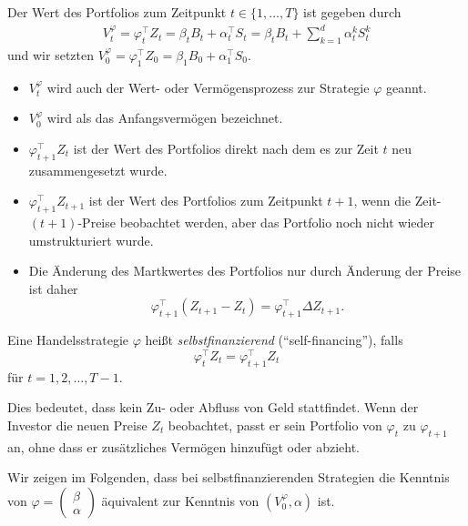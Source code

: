 \documentclass[a4paper,twoside,DIV15,BCOR12mm]{scrbook}
\begin{document}
\begin{definition}
Der Wert des Portfolios zum Zeitpunkt $t\in\{1,\ldots,T\}$ ist gegeben durch 
\begin{align*}
V_t^\varphi  = \varphi_t^\top Z_t = \beta_t B_t + \alpha_t^\top S_t = \beta_tB_t + \sum_{k=1}^d \alpha_t^kS_t^k
\end{align*}
und wir setzten $V_0^\varphi = \varphi_1^\top Z_0 = \beta_1B_0 + \alpha_1^\top S_0$.
\end{definition}

\begin{bemerkung}
\begin{itemize}
\item $V_t^\varphi$ wird auch der Wert- oder Vermögensprozess zur Strategie $\varphi$ geannt.
\item $V_0^\varphi$ wird als das Anfangsvermögen bezeichnet.
\item $\varphi_{t+1}^\top Z_t$ ist der Wert des Portfolios direkt nach dem es zur Zeit $t$ neu zusammengesetzt wurde.
\item $\varphi_{t+1}^\top Z_{t+1}$ ist der Wert des Portfolios zum Zeitpunkt $t+1$, wenn die Zeit-$(t+1)$-Preise beobachtet werden, aber das Portfolio noch nicht wieder umstrukturiert wurde.
\item Die Änderung des Martkwertes des Portfolios nur durch Änderung der Preise ist daher
\[
\varphi_{t+1}^\top (Z_{t+1}-Z_t) = \varphi_{t+1}^\top \Delta Z_{t+1}.
\]
\end{itemize}
\end{bemerkung}

\begin{definition}
Eine Handelsstrategie $\varphi$ heißt \emph{selbstfinanzierend} (“self-financing”), falls
\[
\varphi_t^\top Z_t = \varphi_{t+1}^\top Z_t
\]
für $t=1, 2,\ldots,T-1$.
\end{definition}

Dies bedeutet, dass kein Zu- oder Abfluss von Geld stattfindet. Wenn der Investor die neuen Preise $Z_t$ beobachtet, passt er sein Portfolio von $\varphi_t$ zu $\varphi_{t+1}$ an, ohne dass er zusätzliches Vermögen hinzufügt oder abzieht.

Wir zeigen im Folgenden, dass bei selbstfinanzierenden Strategien die Kenntnis von $\varphi 
=\left(\begin{smallmatrix}
\beta \\ \alpha
\end{smallmatrix}\right)$
äquivalent zur Kenntnis von $(V_0^\varphi, \alpha)$ ist.
\end{document}

